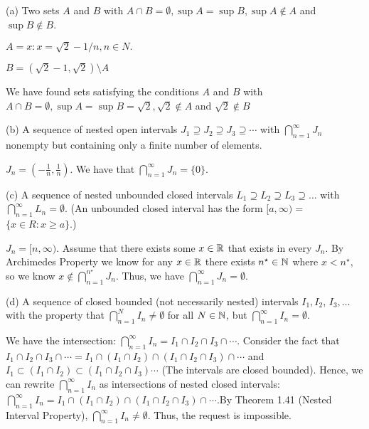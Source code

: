 \documentclass{report}
\begin{document}

(a) Two sets $A$ and $B$ with $A \cap B=\emptyset, \sup A=\sup B, \sup A \notin A$ and $\sup B \notin B$.

\par \bigskip 
$ A = { x : x = \sqrt{2} - 1/n, n \in N }.$ \par $B = (\sqrt{2} -1,\sqrt{2}) \setminus A$ 
\par We have found sets satisfying the conditions $A$ and $B$ with $A \cap B=\emptyset, \sup A=\sup B = \sqrt{2}, \sqrt{2} \notin A$ and $\sqrt{2} \notin B$


\par \bigskip
(b) A sequence of nested open intervals $J_1 \supseteq J_2 \supseteq J_3 \supseteq \cdots$ with $\bigcap_{n=1}^{\infty} J_n$ nonempty but containing only a finite number of elements.
\par \bigskip 
$J_n = (-\frac{1}{n}, \frac{1}{n})$. We have that $\bigcap_{n=1}^{\infty} J_n = \{0\}.$
\par \bigskip
(c) A sequence of nested unbounded closed intervals $L_1 \supseteq L_2 \supseteq L_3 \supseteq \ldots$ with $\bigcap_{n=1}^{\infty} L_n=\emptyset$. (An unbounded closed interval has the form $[a, \infty)=$ $\{x \in R: x \geq a\}$.)
\bigskip

$J_n = [n, \infty)$. Assume that there exists some $x \in \RR$ that exists in every $J_n$. By Archimedes Property we know for any $x \in \RR$ there exists $n^\star \in \NN$ where $ x < n^\star$, so we know $x \not\in \bigcap_{n=1}^{n^\star} J_n$. Thus, we have $\bigcap_{n=1}^{\infty} J_n = \emptyset.$ 

\par \bigskip
(d) A sequence of closed bounded (not necessarily nested) intervals $I_1, I_2$, $I_3, \ldots$ with the property that $\bigcap_{n=1}^N I_n \neq \emptyset$ for all $N \in \NN$, but $\bigcap_{n=1}^{\infty} I_n=\emptyset$.

\par \bigskip
We have the intersection: $\bigcap_{n=1}^\infty I_n = I_1 \cap I_2 \cap I_3 \cap \cdots$. Consider the fact that  $I_1 \cap I_2 \cap I_3 \cap \cdots = I_1 \cap (I_1 \cap  I_2) \cap (I_1 \cap I_2 \cap I_3) \cap \cdots$ and $I_1 \subset (I_1 \cap I_2) \subset (I_1 \cap I_2 \cap I_3) \cdots$ (The intervals are closed bounded).  Hence, we can rewrite $\bigcap_{n=1}^\infty I_n$ as intersections of nested  closed intervals: $\bigcap_{n=1}^\infty I_n = I_1 \cap (I_1 \cap  I_2) \cap (I_1 \cap I_2 \cap I_3) \cap \cdots$.By Theorem 1.41 (Nested Interval Property), $\bigcap_{n=1}^\infty I_n \neq \emptyset.$ Thus, the request is impossible.
\end{document}
